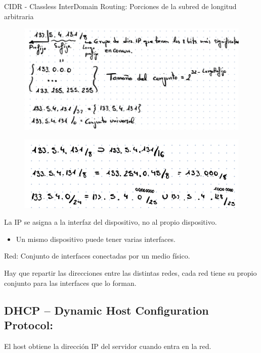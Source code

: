 \documentclass[12pt, twoside, openright]{report} %
\begin{document}
CIDR - Classless InterDomain Routing: Porciones de la subred de
longitud arbitraria
\begin{figure}[H]
	{\includegraphics[scale=.4]{Untitled 34.png}}
\end{figure}
\begin{figure}[H]
	{\includegraphics[scale=.5]{Untitled 35.png}}
\end{figure}

La IP se asigna a la interfaz del dispositivo, no al propio
dispositivo.

\begin{itemize}
	\item Un mismo dispositivo puede tener varias interfaces.
\end{itemize}

Red: Conjunto de interfaces conectadas por un medio físico.


Hay que repartir las direcciones entre las distintas redes, cada red
tiene su propio conjunto para las interfaces que lo forman.



\subsection{DHCP -- Dynamic Host Configuration
	Protocol:}

El host obtiene la dirección IP del servidor cuando entra en la red.
\end{document}

